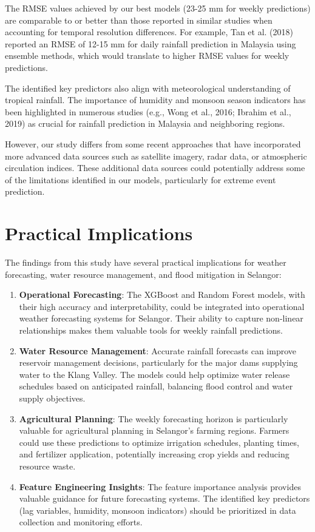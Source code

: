 \documentclass[12pt]{article}
\begin{document}
The RMSE values achieved by our best models (23-25 mm for weekly predictions) are comparable to or better than those reported in similar studies when accounting for temporal resolution differences. For example, Tan et al. (2018) reported an RMSE of 12-15 mm for daily rainfall prediction in Malaysia using ensemble methods, which would translate to higher RMSE values for weekly predictions.

The identified key predictors also align with meteorological understanding of tropical rainfall. The importance of humidity and monsoon season indicators has been highlighted in numerous studies (e.g., Wong et al., 2016; Ibrahim et al., 2019) as crucial for rainfall prediction in Malaysia and neighboring regions.

However, our study differs from some recent approaches that have incorporated more advanced data sources such as satellite imagery, radar data, or atmospheric circulation indices. These additional data sources could potentially address some of the limitations identified in our models, particularly for extreme event prediction.

\section{Practical Implications}
\label{sec:practical_implications}

The findings from this study have several practical implications for weather forecasting, water resource management, and flood mitigation in Selangor:

\begin{enumerate}
    \item \textbf{Operational Forecasting}: The XGBoost and Random Forest models, with their high accuracy and interpretability, could be integrated into operational weather forecasting systems for Selangor. Their ability to capture non-linear relationships makes them valuable tools for weekly rainfall predictions.
    
    \item \textbf{Water Resource Management}: Accurate rainfall forecasts can improve reservoir management decisions, particularly for the major dams supplying water to the Klang Valley. The models could help optimize water release schedules based on anticipated rainfall, balancing flood control and water supply objectives.
    
    \item \textbf{Agricultural Planning}: The weekly forecasting horizon is particularly valuable for agricultural planning in Selangor's farming regions. Farmers could use these predictions to optimize irrigation schedules, planting times, and fertilizer application, potentially increasing crop yields and reducing resource waste.
    
    \item \textbf{Feature Engineering Insights}: The feature importance analysis provides valuable guidance for future forecasting systems. The identified key predictors (lag variables, humidity, monsoon indicators) should be prioritized in data collection and monitoring efforts.
\end{enumerate}
\end{document}
